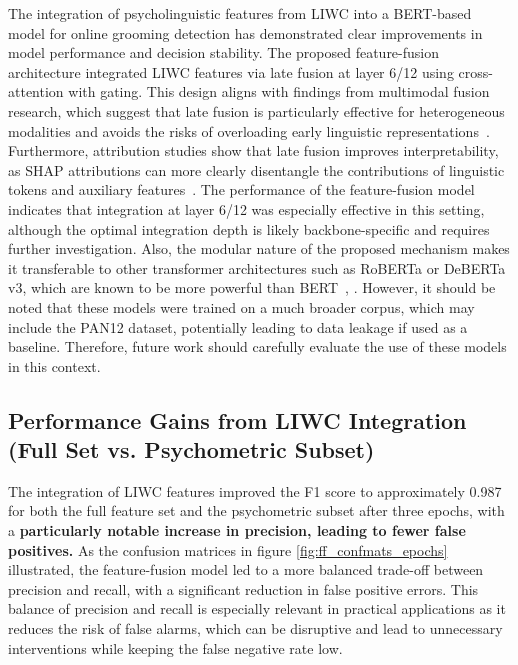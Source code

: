 The integration of psycholinguistic features from LIWC into a BERT-based model for online grooming detection has demonstrated clear improvements in model performance and decision stability. The proposed feature-fusion architecture integrated LIWC features via late fusion at layer 6/12 using cross-attention with gating. This design aligns with findings from multimodal fusion research, which suggest that late fusion is particularly effective for heterogeneous modalities and avoids the risks of overloading early linguistic representations~\cite{shankar2022progressivefusion}. Furthermore, attribution studies show that late fusion improves interpretability, as SHAP attributions can more clearly disentangle the contributions of linguistic tokens and auxiliary features~\cite{shapcat2024interpretable}. The performance of the feature-fusion model indicates that integration at layer 6/12 was especially effective in this setting, although the optimal integration depth is likely backbone-specific and requires further investigation. Also, the modular nature of the proposed mechanism makes it transferable to other transformer architectures such as RoBERTa or DeBERTa v3, which are known to be more powerful than BERT~\cite{liu2019roberta}, \cite{he2023debertav3}. However, it should be noted that these models were trained on a much broader corpus, which may include the PAN12 dataset, potentially leading to data leakage if used as a baseline. Therefore, future work should carefully evaluate the use of these models in this context.

\subsection{Performance Gains from LIWC Integration (Full Set vs. Psychometric Subset)}

The integration of LIWC features improved the F1 score to approximately 0.987 for both the full feature set and the psychometric subset after three epochs, with a \textbf{particularly notable increase in precision, leading to fewer false positives.} As the confusion matrices in figure \ref{fig:ff_confmats_epochs} illustrated, the feature-fusion model led to a more balanced trade-off between precision and recall, with a significant reduction in false positive errors. This balance of precision and recall is especially relevant in practical applications as it reduces the risk of false alarms, which can be disruptive and lead to unnecessary interventions while keeping the false negative rate low. 


